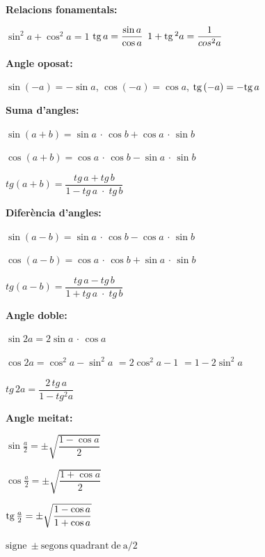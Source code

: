 \label{sec:formularitrig}
\begin{bluebox}
 \textbf{Relacions fonamentals:}
 
\quad [1]\; $\sin^2 a + \cos^2 a = 1$ \qquad     
[2]\; $\mathrm{tg}\, a = \dfrac{\sin a}{\cos a}$ \qquad   
[3]\; $1 + \mathrm{tg}\,^2 a = \dfrac{1}{cos^2 a}$    

 
 \textbf{Angle oposat:}
 
 \quad [4]\; $\sin(-a)=-\sin a$,  \quad$\cos(-a)= \cos a$, \quad $\mathrm{tg}\,(-a)=-\mathrm{tg}\, a$

 \textbf{Suma d'angles:}
 
\quad  [5]\; $     \sin (a+b)=\sin a\, \cdot \, \cos b+\cos a\, \cdot \, \sin b$ 
 
 \quad [6]\; $     \cos (a+b)=\cos a\, \cdot \, \cos b-\sin a\, \cdot \, \sin b$ 
 
 \quad [7]\;$     tg(a+b)=\dfrac{tg\, a+tg\, b}{1-tg\, a\; \cdot \; tg\, b} $ 
 

 
 \textbf{Diferència d'angles:}
 
 \quad [8]\; $  \sin (a-b)=\sin a\, \cdot \, \cos b-\cos a\, \cdot \, \sin b$ 
 
 \quad [9]\;  $ \cos (a-b)=\cos a\, \cdot \, \cos b+\sin a\, \cdot \, \sin b$ 
 
 \quad  [10]\; $ tg(a-b)=\dfrac{tg\, a-tg\, b}{1+tg\, a\; \cdot \; tg\, b} $ 
 \textbf{}
 
  
 \textbf{Angle doble:}
 
 \quad  [11]\; $  \sin 2a=2\sin a\, \cdot \, \cos a$ 
 
 \quad [12]\; $  \cos 2a=\cos ^{2} a-\sin ^{2} a$ 
 $=2\cos^2 a-1$ 
 $=1-2 \sin^2 a$ 
 
 \quad [13]\; $  tg\, 2a=\dfrac{2\, tg\, a}{1-tg^{2} a} $ 
 \textbf{}
 
 
 
 \textbf{Angle meitat:}
 
 \begin{minipage}{0.5\textwidth}
 
 \quad [14]\; $  \sin \frac{a}{2} =\pm \sqrt{\dfrac{1-\cos a}{2} } $ 
 
 \quad [15]\; $  \cos \frac{a}{2} =\pm \sqrt{\dfrac{1+\cos a}{2} } $ 
 
 \quad [16]\; $   \mathrm{tg}\,\frac{a}{2} =\pm \sqrt{\dfrac{1-\cos a}{1+\cos a} } $ 
 
 \end{minipage}
\begin{minipage}{0.4\textwidth}
$\mathrm{signe\ \pm segons\ quadrant\ de\ a/2}$ 
\end{minipage}


\end{bluebox}
